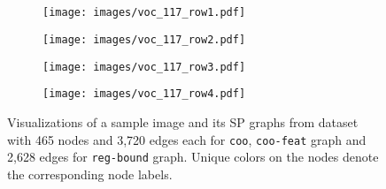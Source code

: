 \documentclass{article}
\begin{document}
\subsection{\pascal}
\begin{figure}[!h]
\centering
\begin{subfigure}
  \centering
  \texttt{[image: images/voc\_117\_row1.pdf]}  
\label{fig:voc-row1}
\end{subfigure}
\vspace{-20pt}
\begin{subfigure}
  \centering
  \texttt{[image: images/voc\_117\_row2.pdf]}  
\label{fig:voc-row2}
\end{subfigure}
\vspace{-20pt}
\begin{subfigure}
  \centering
  \texttt{[image: images/voc\_117\_row3.pdf]}  
\label{fig:voc-row3}
\end{subfigure}
\vspace{-20pt}
\begin{subfigure}
  \centering
  \texttt{[image: images/voc\_117\_row4.pdf]}  
\label{fig:voc-row4}
\end{subfigure}
\caption{Visualizations of a sample image and its SP graphs from \pascal dataset with 465 nodes and 3,720 edges each for \texttt{coo}, \texttt{coo-feat} graph and 2,628 edges for \texttt{reg-bound} graph. Unique colors on the nodes denote the corresponding node labels.}
\label{fig:fig_viz_voc}
\end{figure}





\newpage
\end{document}
